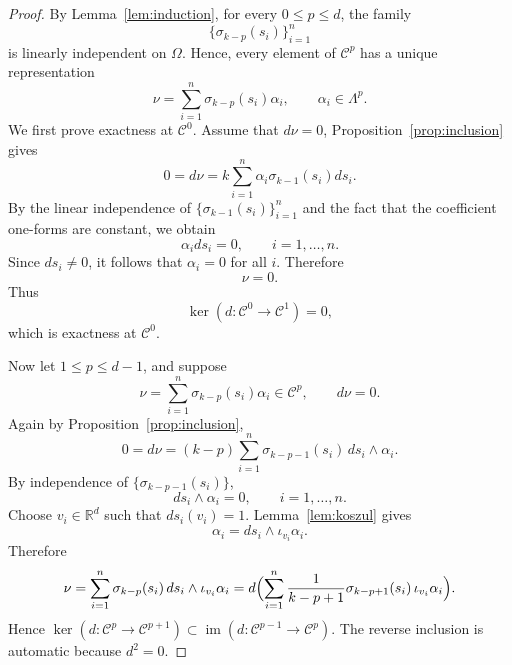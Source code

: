 \documentclass[pdflatex,sn-mathphys-num]{sn-jnl}
\numberwithin{equation}{section}
\numberwithin{theorem}{section}
\numberwithin{table}{section}
\numberwithin{figure}{section}
\begin{document}
\begin{proof}
By Lemma~\ref{lem:induction}, for every $0\le p\le d$, the family
\begin{equation}
\{\sigma_{k-p}(s_i)\}_{i=1}^n
\end{equation}
is linearly independent on $\Omega$. Hence, every element of $\mathcal C^p$ has a unique representation
\begin{equation}
\nu=\sum_{i=1}^n
\sigma_{k-p}(s_i)\alpha_i,
\qquad
\alpha_i\in\Lambda^p.
\end{equation}
We first prove exactness at $\mathcal C^0$. Assume that $ d\nu=0$, Proposition~\ref{prop:inclusion} gives
\begin{equation}
0= d\nu =k\sum_{i=1}^n
\alpha_i\sigma_{k-1}(s_i)d s_i.
\end{equation}
By the linear independence of $\{\sigma_{k-1}(s_i)\}_{i=1}^n$ and the fact that the coefficient one-forms are constant, we obtain
\begin{equation}
\alpha_i d s_i=0,
\qquad i=1,\ldots,n.
\end{equation}
Since $ d s_i\neq0$, it follows that $\alpha_i=0$ for all $i$. Therefore
\begin{equation}
\nu=0.
\end{equation}
Thus
\begin{equation}
\ker( d:\mathcal C^0\to\mathcal C^1)=0,
\end{equation}
which is exactness at $\mathcal C^0$.

Now let $1\le p\le d-1$, and suppose
\begin{equation}
\nu=\sum_{i=1}^n \sigma_{k-p}(s_i)\alpha_i \in \mathcal C ^p,
\qquad d\nu=0.
\end{equation}
Again by Proposition~\ref{prop:inclusion},
\begin{equation}
0=d\nu=(k-p)\sum_{i=1}^n \sigma_{k-p-1}(s_i)\,ds_i\wedge\alpha_i.
\end{equation}
By independence of $\{\sigma_{k-p-1}(s_i)\}$,
\begin{equation}
ds_i\wedge\alpha_i=0,
\qquad i=1,\dots,n.
\end{equation}
Choose $v_i\in\mathbb  R  ^d$ such that $ds_i(v_i)=1$. Lemma~\ref{lem:koszul} gives
\begin{equation}
\alpha_i=ds_i\wedge \iota_{v_i}\alpha_i.
\end{equation}
Therefore
\begin{equation}
\nu
=\sum_{i=1}^n \sigma_{k-p}(s_i)\,ds_i\wedge \iota_{v_i}\alpha_i
=d\Bigl(\sum_{i=1}^n \frac{1}{k-p+1}\sigma_{k-p+1}(s_i)\,\iota_{v_i}\alpha_i\Bigr).
\end{equation}
Hence $\ker(d:\mathcal C ^p\to\mathcal C ^{p+1})\subset \operatorname{im}(d:\mathcal C ^{p-1}\to\mathcal C ^p)$.
The reverse inclusion is automatic because $d^2=0$.


\end{proof}
\end{document}
